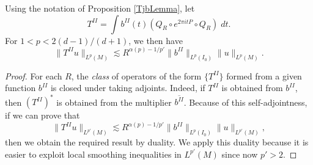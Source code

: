 \begin{lemma} \label{LocalSmoothingLargeTimesTheorem}
    Using the notation of Proposition \ref{TjbLemma}, let
    \begin{equation}
        T^{II} = \int b^{II}(t) (Q_R \circ e^{2 \pi i t P} \circ Q_R)\; dt.
    \end{equation}
    For $1 < p < 2 (d-1)/(d+1)$, we then have
    \begin{equation}
        \| T^{II} u \|_{L^p(M)} \lesssim R^{\alpha(p) - 1/p'} \| b^{II} \|_{L^p(I_0)} \| u \|_{L^p(M)}.
    \end{equation}
\end{lemma}
\begin{proof}
    For each $R$, the \emph{class} of operators of the form $\{ T^{II} \}$ formed from a given function $b^{II}$ is closed under taking adjoints. Indeed, if $T^{II}$ is obtained from $b^{II}$, then $(T^{II})^*$ is obtained from the multiplier $\overline{b^{II}}$. Because of this self-adjointness, if we can prove that
    \begin{equation}
        \| T^{II} u \|_{L^{p'}(M)} \lesssim R^{\alpha(p) - 1/p'} \| b^{II} \|_{L^p(I_0)} \| u \|_{L^{p'}(M)},
    \end{equation}
    then we obtain the required result by duality. We apply this duality because it is easier to exploit local smoothing inequalities in $L^{p'}(M)$ since now $p' > 2$.


\end{proof}
